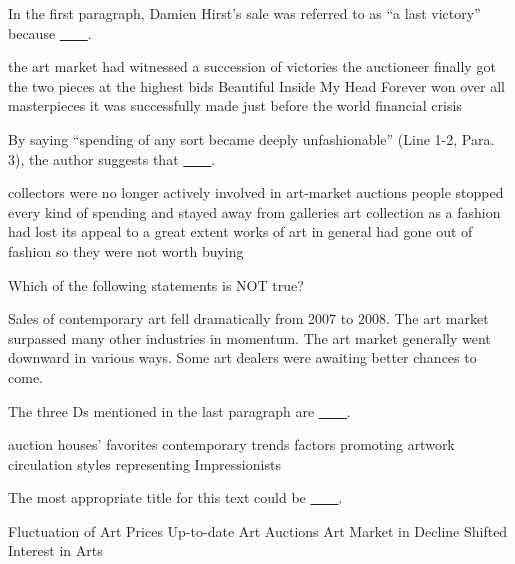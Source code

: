 \item In the first paragraph, Damien Hirst's sale was referred to as ``a last victory'' because \uline{~~~~}.
\begin{tasks}
	\task the art market had witnessed a succession of victories
	\task the auctioneer finally got the two pieces at the highest bids
	\task Beautiful Inside My Head Forever won over all masterpieces
	\task it was successfully made just before the world financial crisis
\end{tasks}
\item By saying ``spending of any sort became deeply unfashionable'' (Line 1-2, Para. 3), the author suggests that \uline{~~~~}.
\begin{tasks}
	\task collectors were no longer actively involved in art-market auctions
	\task people stopped every kind of spending and stayed away from galleries
	\task art collection as a fashion had lost its appeal to a great extent
	\task works of art in general had gone out of fashion so they were not worth buying
\end{tasks}
\item Which of the following statements is NOT true?
\begin{tasks}
	\task Sales of contemporary art fell dramatically from 2007 to 2008.
	\task The art market surpassed many other industries in momentum.
	\task The art market generally went downward in various ways.
	\task Some art dealers were awaiting better chances to come.
\end{tasks}
\item The three Ds mentioned in the last paragraph are \uline{~~~~}.
\begin{tasks}
	\task auction houses' favorites
	\task contemporary trends
	\task factors promoting artwork circulation
	\task styles representing Impressionists
\end{tasks}
\item The most appropriate title for this text could be \uline{~~~~}.
\begin{tasks}
	\task Fluctuation of Art Prices
	\task Up-to-date Art Auctions
	\task Art Market in Decline
	\task Shifted Interest in Arts
\end{tasks}
